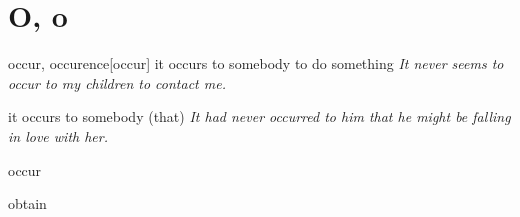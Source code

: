 \section{O, o}

\begin{word}{occur, occurence}[occur]
    it occurs to somebody to do something 
    \textit{It never seems to occur to my children to contact me.}
    
    it occurs to somebody (that)
    \textit{It had never occurred to him that he might be falling in love with her.}
\end{word}

\begin{word}{occur}
\end{word}

\begin{word}{obtain}
\end{word}